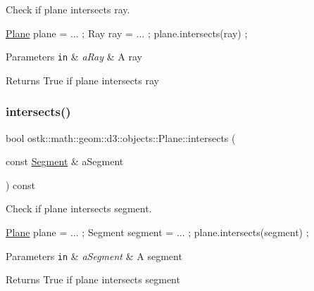 Check if plane intersects ray. 


\begin{DoxyCode}
\hyperlink{classostk_1_1math_1_1geom_1_1d3_1_1objects_1_1_plane_ac66c2a3b3d9d7cd1fd507123091bb38f}{Plane} plane = ... ;
Ray ray = ... ;
plane.intersects(ray) ;
\end{DoxyCode}



\begin{DoxyParams}[1]{Parameters}
\mbox{\tt in}  & {\em a\+Ray} & A ray \\
\hline
\end{DoxyParams}
\begin{DoxyReturn}{Returns}
True if plane intersects ray 
\end{DoxyReturn}
\mbox{\label{classostk_1_1math_1_1geom_1_1d3_1_1objects_1_1_plane_a7b1d164ebd925ed9329479f9f522c7f9}} 
\subsubsection{\texorpdfstring{intersects()}{intersects()}\hspace{0.1cm}{\footnotesize\ttfamily [5/5]}}
{\footnotesize\ttfamily bool ostk\+::math\+::geom\+::d3\+::objects\+::\+Plane\+::intersects (\begin{DoxyParamCaption}\item[{const \hyperlink{classostk_1_1math_1_1geom_1_1d3_1_1objects_1_1_segment}{Segment} \&}]{a\+Segment }\end{DoxyParamCaption}) const}



Check if plane intersects segment. 


\begin{DoxyCode}
\hyperlink{classostk_1_1math_1_1geom_1_1d3_1_1objects_1_1_plane_ac66c2a3b3d9d7cd1fd507123091bb38f}{Plane} plane = ... ;
Segment segment = ... ;
plane.intersects(segment) ;
\end{DoxyCode}



\begin{DoxyParams}[1]{Parameters}
\mbox{\tt in}  & {\em a\+Segment} & A segment \\
\hline
\end{DoxyParams}
\begin{DoxyReturn}{Returns}
True if plane intersects segment 
\end{DoxyReturn}
\mbox{\label{classostk_1_1math_1_1geom_1_1d3_1_1objects_1_1_plane_a62401be167d9574a4b20f2a88f7d6c79}} 

